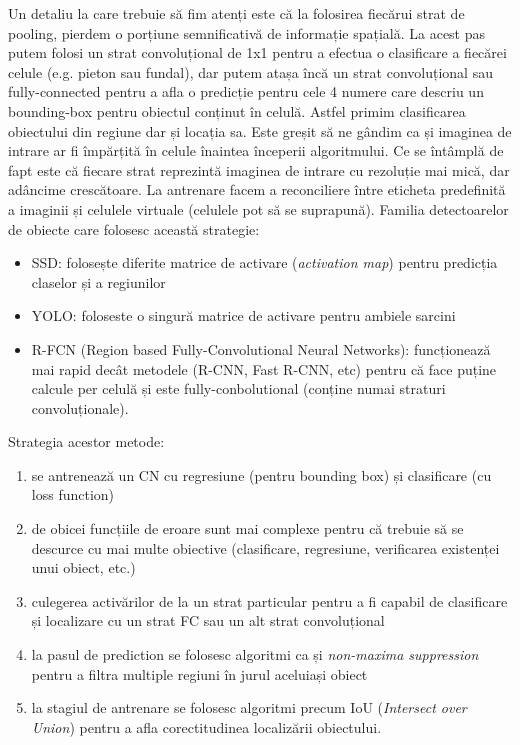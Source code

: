 Un detaliu la care trebuie să fim atenți este că la folosirea fiecărui strat de pooling, pierdem o porțiune semnificativă de informație spațială.\newline
La acest pas putem folosi un strat convoluțional de 1x1 pentru a efectua o clasificare a fiecărei celule (e.g. pieton sau fundal), dar putem atașa încă un strat convoluțional sau fully-connected pentru a afla o predicție pentru cele 4 numere care descriu un bounding-box pentru obiectul conținut în celulă. Astfel primim clasificarea obiectului din regiune dar și locația sa.\newline
Este greșit să ne gândim ca și imaginea de intrare ar fi împărțită în celule înaintea începerii algoritmului. Ce se întâmplă de fapt este că fiecare strat reprezintă imaginea de intrare cu rezoluție mai mică, dar adâncime crescătoare. La antrenare facem a reconciliere între eticheta predefinită a imaginii și celulele virtuale (celulele pot să se suprapună).\newline
Familia detectoarelor de obiecte care folosesc această strategie:
\begin{itemize}
	\item SSD: folosește diferite matrice de activare (\textit{activation map}) pentru predicția claselor și a regiunilor
	\item YOLO: foloseste o singură matrice de activare pentru ambiele sarcini
	\item R-FCN (Region based Fully-Convolutional Neural Networks): funcționează mai rapid decât metodele (R-CNN, Fast R-CNN, etc) pentru că face puține calcule per celulă și este fully-conbolutional (conține numai straturi convoluționale).
\end{itemize}
Strategia acestor metode:
\begin{enumerate}
	\item se antrenează un CN cu regresiune (pentru bounding box) și clasificare (cu loss function)
	\item de obicei funcțiile de eroare sunt mai complexe pentru că trebuie să se descurce cu mai multe obiective (clasificare, regresiune, verificarea existenței unui obiect, etc.)
	\item culegerea activărilor de la un strat particular pentru a fi capabil de clasificare și localizare cu un strat FC sau un alt strat convoluțional
	 \item la pasul de prediction se folosesc algoritmi ca și \textit{non-maxima suppression} pentru a filtra multiple regiuni în jurul aceluiași obiect
	\item la stagiul de antrenare se folosesc algoritmi precum IoU (\textit{Intersect over Union}) pentru a afla corectitudinea localizării obiectului.
\end{enumerate}


